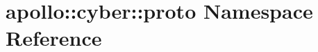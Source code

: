 \hypertarget{namespaceapollo_1_1cyber_1_1proto}{\section{apollo\-:\-:cyber\-:\-:proto Namespace Reference}
\label{namespaceapollo_1_1cyber_1_1proto}
}
